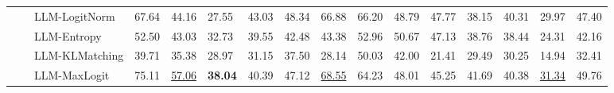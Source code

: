 \begin{table}[ht!]
\begin{tabularx}{\textwidth}{@{}l l l |l *{11}{Y}|Y@{}}
 &  & LLM-LogitNorm & 67.64 & 44.16 & 27.55 & 43.03 & 48.34 & 66.88 & 66.20 & 48.79 & 47.77 & 38.15 & 40.31 & 29.97 & 47.40 \\
 &  & LLM-Entropy & 52.50 & 43.03 & 32.73 & 39.55 & 42.48 & 43.38 & 52.96 & 50.67 & 47.13 & 38.76 & 38.44 & 24.31 & 42.16 \\
 &  & LLM-KLMatching & 39.71 & 35.38 & 28.97 & 31.15 & 37.50 & 28.14 & 50.03 & 42.00 & 21.41 & 29.49 & 30.25 & 14.94 & 32.41 \\
 &  & LLM-MaxLogit & 75.11 & \underline{57.06} & \textbf{38.04} & 40.39 & 47.12 & \underline{68.55} & 64.23 & 48.01 & 45.25 & 41.69 & 40.38 & \underline{31.34} & 49.76 \\
\bottomrule
\end{tabularx}
\label{table::openset_LCR0.1}
\end{table}
